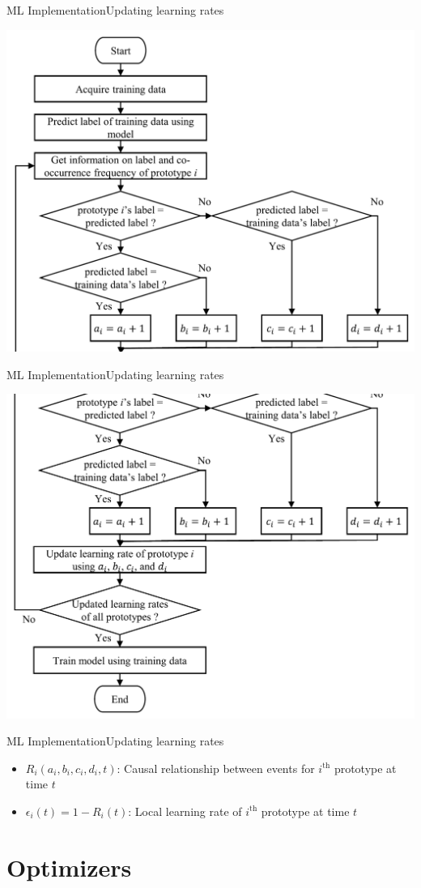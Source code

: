 \documentclass[
	aspectratio=169,	%
	onlytextwidth,		%
	t,					%
	]{beamer}
\begin{document}
	\begin{frame}[fragile]{ML Implementation}{Updating learning rates}
	
		\centering
				\includegraphics[width=.4\textwidth]{myfigs/lr flowchart1.png}
	\end{frame}

	\begin{frame}[fragile]{ML Implementation}{Updating learning rates}
	
		\centering
				\includegraphics[width=.4\textwidth]{myfigs/lr flowchart2.png}
	\end{frame}

	\begin{frame}{ML Implementation}{Updating learning rates}
		\vfill
		\begin{itemize}
			\item<1->$R_{i}(a_{i},b_{i},c_{i},d_{i},t)$: Causal relationship between events for $i^{\text{th}}$ prototype at time $t$
			\item<2->$\epsilon_{i}(t) = 1- R_{i}(t)$: Local learning rate of $i^{\text{th}}$ prototype at time $t$
		\end{itemize}
		\vfill

	\end{frame}


	\section{Optimizers}
	
\end{document}
